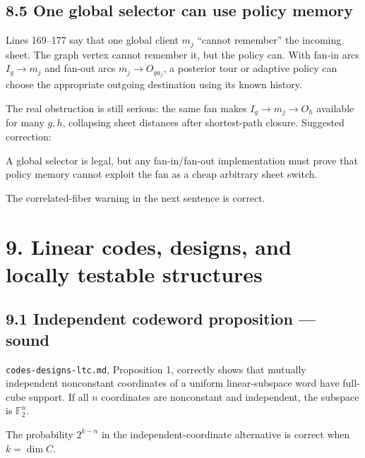 \documentclass[11pt,a4paper]{article}
\begin{document}
\subsection*{8.5 One global selector can use policy memory}

Lines 169–177 say that one global client \(m_j\) “cannot remember” the incoming sheet.  The graph vertex cannot remember it, but the policy can.  With fan-in arcs \(I_g\to m_j\) and fan-out arcs \(m_j\to O_{ga_j}\), a posterior tour or adaptive policy can choose the appropriate outgoing destination using its known history.


The real obstruction is still serious: the same fan makes \(I_g\to m_j\to O_h\) available for many \(g,h\), collapsing sheet distances after shortest-path closure.  Suggested correction:


\begin{ResearchQuote}

A global selector is legal, but any fan-in/fan-out implementation must prove that policy memory cannot exploit the fan as a cheap arbitrary sheet switch.

\end{ResearchQuote}

The correlated-fiber warning in the next sentence is correct.


\section*{9. Linear codes, designs, and locally testable structures}

\subsection*{9.1 Independent codeword proposition — sound}

\nolinkurl{codes-designs-ltc.md}, Proposition 1, correctly shows that mutually independent nonconstant coordinates of a uniform linear-subspace word have full-cube support.  If all \(n\) coordinates are nonconstant and independent, the subspace is \(\mathbb F_2^n\).


The probability \(2^{k-n}\) in the independent-coordinate alternative is correct when \(k=\dim C\).
\end{document}
